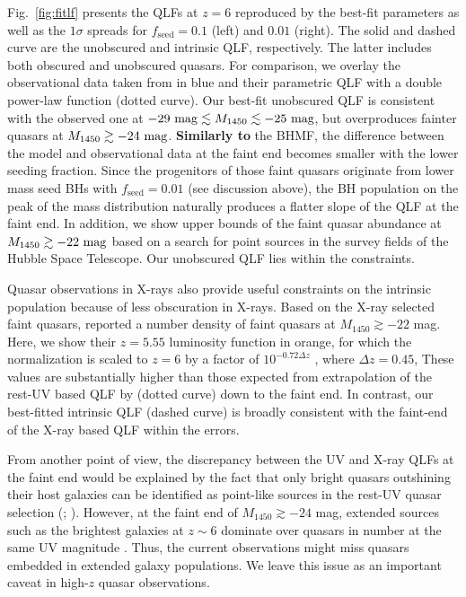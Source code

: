 \documentclass[twocolumn, twocolappendix]{aastex63}
\newcommand{\fseed}{f_\mathrm{seed}}
\newcommand{\Muv}{M_{1450}}
\begin{document}
\begin{CJK*}{UTF8}{gbsn}
Fig.~\ref{fig:fitlf} presents the QLFs at $z=6$ reproduced by the best-fit parameters as well as the $1\sigma$ spreads
for $\fseed = 0.1$ (left) and $0.01$ (right).
The solid and dashed curve are the unobscured and intrinsic QLF, respectively.
The latter includes both obscured and unobscured quasars.
For comparison, we overlay the observational data taken from  in blue
and their parametric QLF with a double power-law function (dotted curve).
Our best-fit unobscured QLF is consistent with the observed one at $-29~{\rm mag} \lesssim \Muv \lesssim -25~{\rm mag}$,
but overproduces fainter quasars at $\Muv\gtrsim -24~{\rm mag}$.
\textbf{Similarly to} the BHMF, the difference between the model and observational data at the faint end becomes smaller with
the lower seeding fraction.
Since the progenitors of those faint quasars originate from lower mass seed BHs with $\fseed =0.01$ (see discussion above),
the BH population on the peak of the mass distribution naturally produces a flatter slope of the QLF at the faint end.
In addition, we show upper bounds of the faint quasar abundance at $\Muv\gtrsim -22~{\rm mag}$ \citep[green;][]{2022NatAs...6..850J}
based on a search for point sources in the survey fields of the Hubble Space Telescope.
Our unobscured QLF lies within the constraints.


Quasar observations in X-rays also provide 
useful constraints on the intrinsic population because of less obscuration in X-rays.
Based on the X-ray selected faint quasars, \cite{2019ApJ...884...19G} reported a number density of 
faint quasars at $\Muv \gtrsim -22$ mag.
Here, we show their $z=5.55$ luminosity function in orange,
for which the normalization is scaled to $z=6$ by a factor of
$10^{-0.72\Delta z}$ \citep{2016ApJ...833..222J}, where $\Delta z=0.45$,
These values are substantially higher than those expected from extrapolation of the rest-UV based QLF by 
 (dotted curve) down to the faint end.
In contrast, our best-fitted intrinsic QLF (dashed curve) is broadly consistent with the faint-end of the X-ray based QLF within the errors.

From another point of view, the discrepancy between the UV and X-ray QLFs at the faint end would be explained by the fact that 
only bright quasars outshining their host galaxies can be identified as point-like sources in the rest-UV quasar selection 
(; \citealt{2020MNRAS.495.2135N,2020MNRAS.494.1771A,2021MNRAS.502.2757O,2021MNRAS.502..662B,2022AJ....164..114K}).
However, at the faint end of $\Muv\gtrsim -24$ mag, extended sources such as the brightest galaxies at $z\sim 6$ 
dominate over quasars in number at the same UV magnitude \citep{2022ApJS..259...20H}.
Thus, the current observations might miss quasars embedded in extended galaxy populations. 
We leave this issue as an important caveat in high-$z$ quasar observations.



\end{CJK*}
\end{document}
